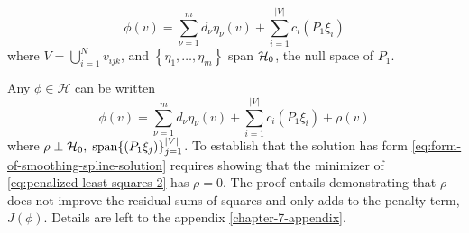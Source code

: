 \begin{equation} \label{eq:form-of-smoothing-spline-solution}
\phi\left( v \right) = \sum_{\nu=1}^{m} d_\nu \eta_\nu \left( v \right) + \sum_{i = 1}^{\vert V \vert} c_{i}\left(P_1 \xi_i \right)
\end{equation}
\noindent
where $V = \bigcup\limits_{i = 1}^N v_{ijk}$, and $\left\{\eta_1,\dots, \eta_{m}\right\}$ span $\mathcal{H}_0$, the null space of $P_1$.

\bigskip

Any $\phi \in \mathcal{H}$ can be written 
\begin{equation} \label{eq:smoothing-spline-representer-expansion-1}
\phi\left( v \right) = \sum_{\nu=1}^{m} d_\nu \eta_\nu \left( v \right) + \sum_{i = 1}^{\vert V \vert} c_{i}\left(P_1 \xi_i \right) + \rho\left(v\right)
\end{equation}
\noindent
where $\rho \perp \mathcal{H}_0,\; \textup{span}\lbrace \left(P_1 \xi_{j} \right) \rbrace_{j = 1}^{\vert V\vert}$. To establish that the solution has form \ref{eq:form-of-smoothing-spline-solution} requires showing that the minimizer of \ref{eq:penalized-least-squares-2} has $\rho = 0$. The proof entails demonstrating that $\rho$ does not improve the residual sums of squares and only adds to the penalty term, $J\left(\phi\right)$. Details are left to the appendix \ref{chapter-7-appendix}.



